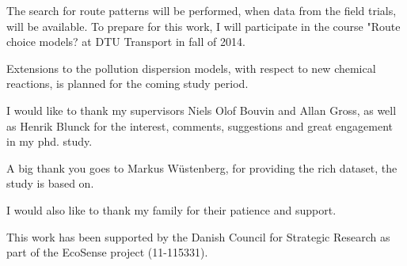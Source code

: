 The search for route patterns will be performed, when data from the field trials, will be available. To prepare for this work, I will participate in the course "Route choice models? at DTU Transport in fall of 2014.

Extensions to the pollution dispersion models, with respect to new chemical reactions, is planned for the coming study period.


I would like to thank my supervisors Niels Olof Bouvin and Allan Gross, as well as Henrik Blunck for the interest, comments, suggestions and great engagement in my phd. study. 

A big thank you goes to Markus W\"ustenberg, for providing the rich dataset, the study is based on.

I would also like to thank my family for their patience and support.

\vspace{20pt}
This work has been supported by the Danish Council for Strategic Research as part of the EcoSense project (11-115331).